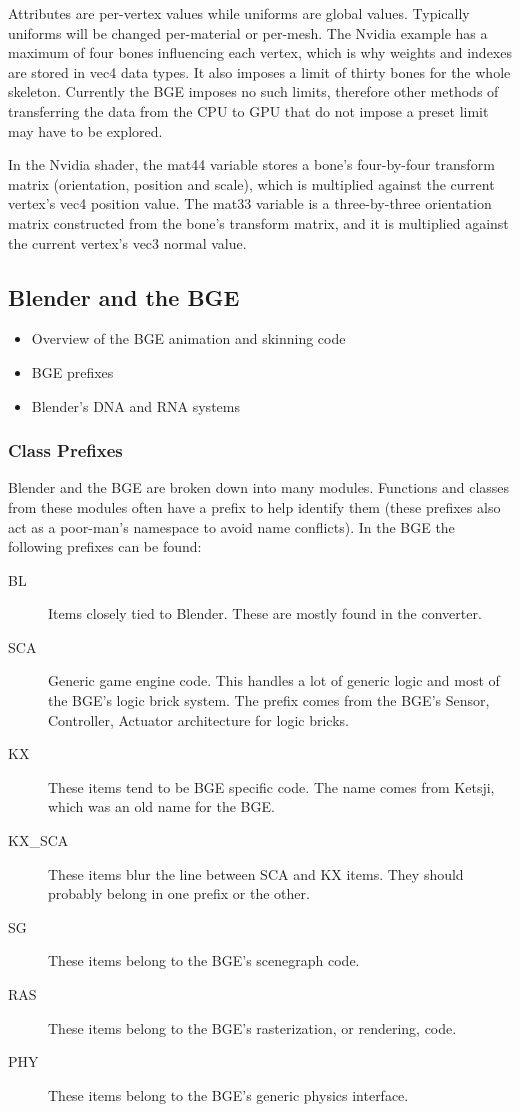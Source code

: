 
Attributes are per-vertex values while uniforms are global values. Typically uniforms will be changed per-material or per-mesh. The Nvidia example has a maximum of four bones influencing each vertex, which is why weights and indexes are stored in vec4 data types. It also imposes a limit of thirty bones for the whole skeleton. Currently the BGE imposes no such limits, therefore other methods of transferring the data from the CPU to GPU that do not impose a preset limit may have to be explored.

In the Nvidia shader, the mat44 variable stores a bone's four-by-four transform matrix (orientation, position and scale), which is multiplied against the current vertex's vec4 position value. The mat33 variable is a three-by-three orientation matrix constructed from the bone's transform matrix, and it is multiplied against the current vertex's vec3 normal value.

\subsection{Blender and the BGE}
\begin{itemize}
 \item Overview of the BGE animation and skinning code
 \item BGE prefixes
 \item Blender's DNA and RNA systems
\end{itemize}

\subsubsection{Class Prefixes}
Blender and the BGE are broken down into many modules. Functions and classes from these modules often have a prefix to help identify them (these prefixes also act as a poor-man's namespace to avoid name conflicts). In the BGE the following prefixes can be found:

\begin{description}
 \item[BL] Items closely tied to Blender. These are mostly found in the converter.
 \item[SCA] Generic game engine code. This handles a lot of generic logic and most of the BGE's logic brick system. The prefix comes from the BGE's Sensor, Controller, Actuator architecture for logic bricks.
 \item [KX] These items tend to be BGE specific code. The name comes from Ketsji, which was an old name for the BGE.
 \item [KX\_SCA] These items blur the line between SCA and KX items. They should probably belong in one prefix or the other.
 \item [SG] These items belong to the BGE's scenegraph code.
 \item [RAS] These items belong to the BGE's rasterization, or rendering, code.
 \item [PHY] These items belong to the BGE's generic physics interface.
\end{description}

